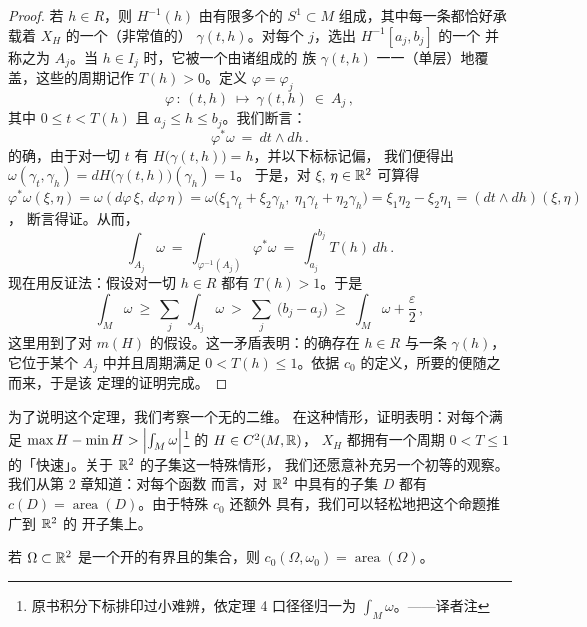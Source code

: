 \begin{proof}
若 $h\in R$，则 $H^{-1}(h)$ 由有限多个\trEmbedding{}的\trCircle{} $S^{1}\subset M$%
组成，其中每一条都恰好承载着 $X_H$ 的一个（非常值的）\trPeriodicSolution{}%
$\gamma(t,h)$。对每个 $j$，选出 $H^{-1}[a_{j},b_{j}]$ 的一个\trConnectedComponent{}%
并称之为 $A_{j}$。当 $h\in I_{j}$ 时，它被一个由诸\trPeriodicSolution{}组成的%
\trSmooth{}族 $\gamma(t,h)$ 一一（单层）地覆盖，这些\trPeriodicSolution{}的周期记作%
$T(h)>0$。定义\trDiffeomorphism{} $\varphi=\varphi_{j}$
\[
\varphi\,:\,(t,h)\ \mapsto\ \gamma(t,h)\ \in\ A_{j}\,,
\]
其中 $0\leq t<T(h)$ 且 $a_{j}\leq h\leq b_{j}$。我们断言：
\[
\varphi^{*}\omega\ =\ dt\wedge dh\,.
\]
的确，由于对一切 $t$ 有 $H\bigl(\gamma(t,h)\bigr)=h$，并以下标标记偏\trDerivative，%
我们便得出 $\omega(\gamma_{t},\gamma_{h})=dH\bigl(\gamma(t,h)\bigr)(\gamma_{h})=1$。%
于是，对 $\xi$, $\eta\in\mathbb{R}^{2}$ 可算得 $\varphi^{*}\omega(\xi,\eta)=\omega(d\varphi\,\xi,\,d\varphi\,\eta)=\omega\bigl(\xi_{1}\gamma_{t}+\xi_{2}\gamma_{h},\ \eta_{1}\gamma_{t}+\eta_{2}\gamma_{h}\bigr)=\xi_{1}\eta_{2}-\xi_{2}\eta_{1}=(dt\wedge dh)(\xi,\eta)$，%
断言得证。从而，
\[
\int_{A_{j}}\omega\ =\ \int_{\varphi^{-1}(A_{j})}\varphi^{*}\omega\ =\ \int_{a_{j}}^{b_{j}}T(h)\,dh\,.
\]
现在用反证法：假设对一切 $h\in R$ 都有 $T(h)>1$。于是
\[
\int_{M}\omega\ \geq\ \sum_{j}\ \int_{A_{j}}\omega\ >\ \sum_{j}\ \bigl(b_{j}-a_{j}\bigr)\ \geq\ \int_{M}\omega+\frac{\varepsilon}{2}\,,
\]
这里用到了对 $m(H)$ 的假设。这一矛盾表明：的确存在 $h\in R$ 与一条%
\trPeriodicSolution{} $\gamma(h)$，它位于某个 $A_{j}$ 中并且周期满足%
$0<T(h)\leq1$。依据 $c_{0}$ 的定义，所要的\trEstimate{}便随之而来，于是该%
定理的证明完成。
\end{proof}

为了说明这个定理，我们考察一个无\trBoundary{}的\trCompact{}二维\trManifold。%
在这种情形，证明表明：对每个满足 $\max H-\min H>\Bigl|\int_{M}\omega\Bigr|$\footnote{原书积分下标排印过小难辨，依定理 4 口径径归一为 $\int_{M}\omega$。——译者注} 的%
$H\in C^{2}(M,\mathbb{R})$，\trHamiltonianVectorField{} $X_H$ 都拥有一个周期%
$0<T\leq1$ 的「快速」\trPeriodicSolution。关于 $\mathbb{R}^{2}$ 的子集这一特殊情形，%
我们还愿意补充另一个初等的观察。我们从第 2 章知道：对每个\trCapacity{}函数%
而言，对 $\mathbb{R}^{2}$ 中具有\trSmooth{}\trBoundary{}的\trBounded\trConnected{}子集%
$D$ 都有 $c(D)=\operatorname{area}(D)$。由于特殊\trCapacity{} $c_{0}$ 还额外%
具有\trInnerRegularity，我们可以轻松地把这个命题推广到 $\mathbb{R}^{2}$ 的%
开子集上。

\begin{proposition}\label{prop:c0-area-open-planar}
若 $\Omega\subset\mathbb{R}^{2}$ 是一个开的有界且\trPathConnected{}的集合，则%
$c_{0}(\Omega,\omega_{0})=\operatorname{area}(\Omega)$。
\end{proposition}

